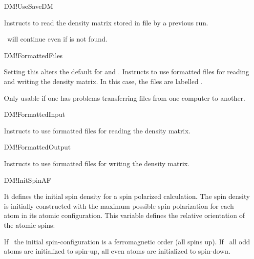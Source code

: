 \begin{fdflogicalF}{DM!UseSaveDM}
  
  Instructs to read the density matrix stored in file
   by a previous run.
  
  \siesta\ will continue even if  is not found.

\end{fdflogicalF}

\begin{fdflogicalF}{DM!FormattedFiles}

  Setting this alters the default for  and 
  .
  Instructs to use formatted files for reading and writing
  the density matrix. In this case, the files are labelled
  .
  
  Only usable if one has problems transferring files from one computer
  to another.

\end{fdflogicalF}

\begin{fdflogicalF}{DM!FormattedInput}

  Instructs to use formatted files for reading the density
  matrix.
  
\end{fdflogicalF}

\begin{fdflogicalF}{DM!FormattedOutput}

  Instructs to use formatted files for writing the density
  matrix.
  
\end{fdflogicalF}

\begin{fdflogicalF}{DM!InitSpinAF}
  
  It defines the initial spin density for a spin polarized calculation.
  The spin density is initially constructed with the maximum possible
  spin polarization for each atom in its atomic configuration.
  This variable defines the relative orientation of the atomic
  spins:

  If \fdffalse\ the initial spin-configuration is a ferromagnetic
  order (all spins up).
  If \fdftrue\ all odd atoms are initialized to spin-up, all even
  atoms are initialized to spin-down.

\end{fdflogicalF}

